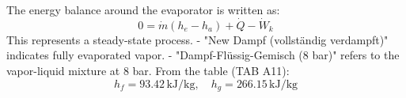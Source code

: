 The energy balance around the evaporator is written as:  
\[
0 = \dot{m} (h_e - h_a) + \dot{Q} - \dot{W}_k
\]  
This represents a steady-state process.  
- "New Dampf (vollständig verdampft)" indicates fully evaporated vapor.  
- "Dampf-Flüssig-Gemisch (8 bar)" refers to the vapor-liquid mixture at 8 bar.  
From the table (TAB A11):  
\[
h_f = 93.42 \, \text{kJ/kg}, \quad h_g = 266.15 \, \text{kJ/kg}
\]